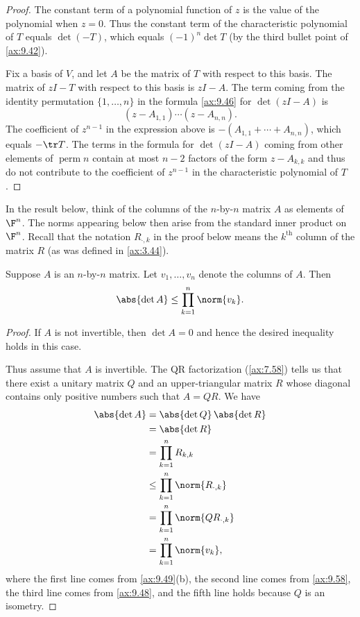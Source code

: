 \begin{proof}
The constant term of a polynomial function of $z$ is the value of the
polynomial when $z=0$. Thus the constant term of the characteristic polynomial
of $T$ equals $\det(-T)$, which equals $(-1)^n\det T$ (by the third bullet
point of \ref{ax:9.42}).

Fix a basis of $V$, and let $A$ be the matrix of $T$ with respect to this
basis. The matrix of $zI-T$ with respect to this basis is $zI-A$. The term
coming from the identity permutation $\{1,\dots,n\}$ in the formula
\ref{ax:9.46} for $\det(zI-A)$ is
\[ (z-A_{1,1})\cdots(z-A_{n,n}). \]
The coefficient of $z^{n-1}$ in the expression above is
$-(A_{1,1}+\cdots+A_{n,n})$, which equals $-\tr T$. The terms in the formula
for $\det(zI-A)$ coming from other elements of $\operatorname{perm} n$ contain
at most $n-2$ factors of the form $z-A_{k,k}$ and thus do not contribute to the
coefficient of $z^{n-1}$ in the characteristic polynomial of $T$.
\end{proof}

%
In the result below, think of the columns of the $n$-by-$n$ matrix $A$ as
elements of $\F^n$. The norms appearing below then arise from the standard
inner product on $\F^n$. Recall that the notation $R_{\cdot,k}$ in the proof
below means the $k^{\text{th}}$ column of the matrix $R$ (as was defined in
\ref{ax:3.44}).

\begin{result}\label{ax:9.66}
Suppose $A$ is an $n$-by-$n$ matrix. Let $v_1,\dots,v_n$ denote the columns of
$A$. Then
\[ \abs{\det A} \le \prod_{k=1}^n\norm{v_k}. \]
\end{result}

\begin{proof}
If $A$ is not invertible, then $\det A=0$ and hence the desired inequality
holds in this case.

Thus assume that $A$ is invertible. The QR factorization (\ref{ax:7.58}) tells
us that there exist a unitary matrix $Q$ and an upper-triangular matrix $R$
whose diagonal contains only positive numbers such that $A=QR$. We have
\begin{align*}
\abs{\det A} &= \abs{\det Q}\,\abs{\det R}\\
  &= \abs{\det R}\\
  &= \prod_{k=1}^n R_{k,k}\\
  &\le \prod_{k=1}^n\norm{R_{\cdot,k}}\\
  &= \prod_{k=1}^n\norm{QR_{\cdot,k}}\\
  &= \prod_{k=1}^n\norm{v_k},
\end{align*}
where the first line comes from \ref{ax:9.49}(b), the second line comes from
\ref{ax:9.58}, the third line comes from \ref{ax:9.48}, and the fifth line
holds because $Q$ is an isometry.
\end{proof}

